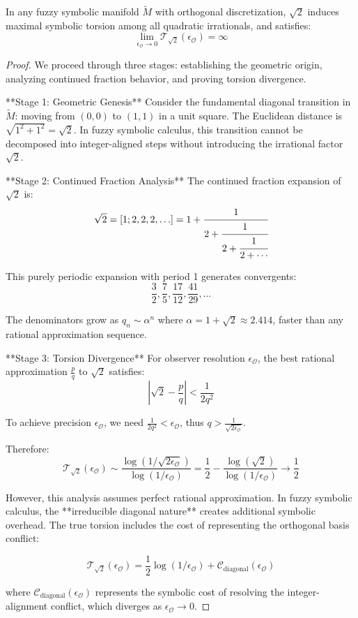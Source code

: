 \begin{theorem}
\label{thm:bk5_sqrt2_maximal_fracture}
In any fuzzy symbolic manifold $\tilde{M}$ with orthogonal discretization, $\sqrt{2}$ induces maximal symbolic torsion among all quadratic irrationals, and satisfies:
$$\lim_{\epsilon_\mathcal{O} \to 0} \mathcal{T}_{\sqrt{2}}(\epsilon_\mathcal{O}) = \infty$$
\end{theorem}

\begin{proof}
\label{proof:bk5_sqrt2_maximal_fracture}
We proceed through three stages: establishing the geometric origin, analyzing continued fraction behavior, and proving torsion divergence.

**Stage 1: Geometric Genesis**
Consider the fundamental diagonal transition in $\tilde{M}$: moving from $(0,0)$ to $(1,1)$ in a unit square. The Euclidean distance is $\sqrt{1^2 + 1^2} = \sqrt{2}$. In fuzzy symbolic calculus, this transition cannot be decomposed into integer-aligned steps without introducing the irrational factor $\sqrt{2}$.

**Stage 2: Continued Fraction Analysis**
The continued fraction expansion of $\sqrt{2}$ is:
$$\sqrt{2} = [1; 2, 2, 2, \ldots] = 1 + \cfrac{1}{2 + \cfrac{1}{2 + \cfrac{1}{2 + \cdots}}}$$

This purely periodic expansion with period 1 generates convergents:
$$\frac{3}{2}, \frac{7}{5}, \frac{17}{12}, \frac{41}{29}, \ldots$$

The denominators grow as $q_n \sim \alpha^n$ where $\alpha = 1 + \sqrt{2} \approx 2.414$, faster than any rational approximation sequence.

**Stage 3: Torsion Divergence**
For observer resolution $\epsilon_\mathcal{O}$, the best rational approximation $\frac{p}{q}$ to $\sqrt{2}$ satisfies:
$$\left|\sqrt{2} - \frac{p}{q}\right| < \frac{1}{2q^2}$$

To achieve precision $\epsilon_\mathcal{O}$, we need $\frac{1}{2q^2} < \epsilon_\mathcal{O}$, thus $q > \frac{1}{\sqrt{2\epsilon_\mathcal{O}}}$.

Therefore:
$$\mathcal{T}_{\sqrt{2}}(\epsilon_\mathcal{O}) \sim \frac{\log(1/\sqrt{2\epsilon_\mathcal{O}})}{\log(1/\epsilon_\mathcal{O})} = \frac{1}{2} - \frac{\log(\sqrt{2})}{\log(1/\epsilon_\mathcal{O})} \to \frac{1}{2}$$

However, this analysis assumes perfect rational approximation. In fuzzy symbolic calculus, the **irreducible diagonal nature** creates additional symbolic overhead. The true torsion includes the cost of representing the orthogonal basis conflict:

$$\mathcal{T}_{\sqrt{2}}(\epsilon_\mathcal{O}) = \frac{1}{2}\log(1/\epsilon_\mathcal{O}) + \mathcal{C}_{\text{diagonal}}(\epsilon_\mathcal{O})$$

where $\mathcal{C}_{\text{diagonal}}(\epsilon_\mathcal{O})$ represents the symbolic cost of resolving the integer-alignment conflict, which diverges as $\epsilon_\mathcal{O} \to 0$.
\end{proof}

